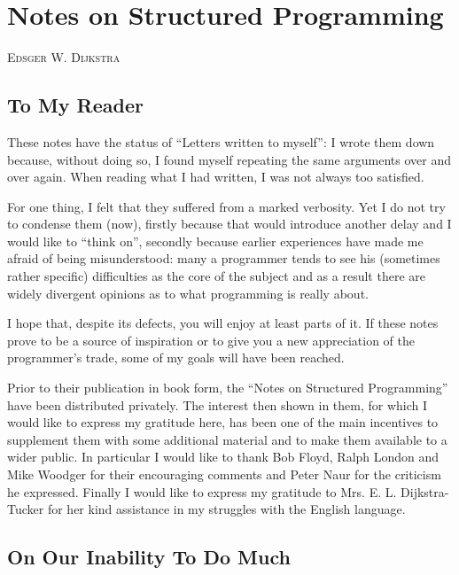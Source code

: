 \chapter{Notes on Structured Programming}

{
	\noindent
	\scshape\hfill\scriptsize Edsger W. Dijkstra\hfill
}
\renewcommand{\leftmark}{\normalfont\scriptsize\hfill E. W. DIJKSTRA\hfill}

\section[To my reader]{To My Reader}

These notes have the status of ``Letters written to myself'': I wrote them down because, without doing so, I found myself repeating the same arguments over and over again. When reading what I had written, I was not always too satisfied.

For one thing, I felt that they suffered from a marked verbosity. Yet I do not try to condense them (now), firstly because that would introduce another delay and I would like to ``think on'', secondly because earlier experiences have made me afraid of being misunderstood: many a programmer tends to see his (sometimes rather specific) difficulties as the core of the subject and as a result there are widely divergent opinions as to what programming is really about.

I hope that, despite its defects, you will enjoy at least parts of it. If these notes prove to be a source of inspiration or to give you a new appreciation of the programmer's trade, some of my goals will have been reached.

Prior to their publication in book form, the ``Notes on Structured Programming'' have been distributed privately. The interest then shown in
them, for which I would like to express my gratitude here, has been one of the main incentives to supplement them with some additional material and to make them available to a wider public. In particular I would like to thank Bob Floyd, Ralph London and Mike Woodger for their encouraging
comments and Peter Naur for the criticism he expressed. Finally I would like to express my gratitude to Mrs. E. L. Dijkstra-Tucker for her kind
assistance in my struggles with the English language.

\section[On our inability to do much]{On Our Inability To Do Much}
\label{sec:our-inability-to-do-much}

